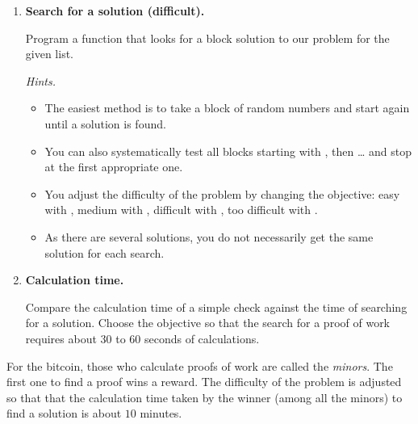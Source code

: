 \documentclass[11pt,class=report,crop=false]{standalone}
\begin{document}
\begin{activite}
\begin{enumerate}
  \item \textbf{Search for a solution (difficult).}
  
  Program a function  that looks for a block  solution to our problem for the given list. 
  
  
  \emph{Hints.}
  
  \begin{itemize}
    \item The easiest method is to take a block  of random numbers and start again until a solution is found.
    
    \item You can also systematically test all blocks starting with \ci{[0,0,0,0,0,0]}, then \ci{[0,0,0,0,0,1]}\ldots{} and stop at the first appropriate one.
    
    \item You adjust the difficulty of the problem by changing the objective: easy with , medium with , difficult with , too difficult with .
    
    \item As there are several solutions, you do not necessarily get the same solution for each search. 
    
   \end{itemize}
   
   \item \textbf{Calculation time.}
   
   Compare the calculation time of a simple check against the time of searching for a solution. Choose the objective  so that the search for a proof of work requires about 30 to 60 seconds of calculations.
  
\end{enumerate}  

For the bitcoin, those who calculate proofs of work are called the \emph{minors}. The first one to find a proof wins a reward. The difficulty of the problem is adjusted so that 
that the calculation time taken by the winner (among all the minors) to find a solution is about $10$ minutes.

\end{activite}


\end{document}
